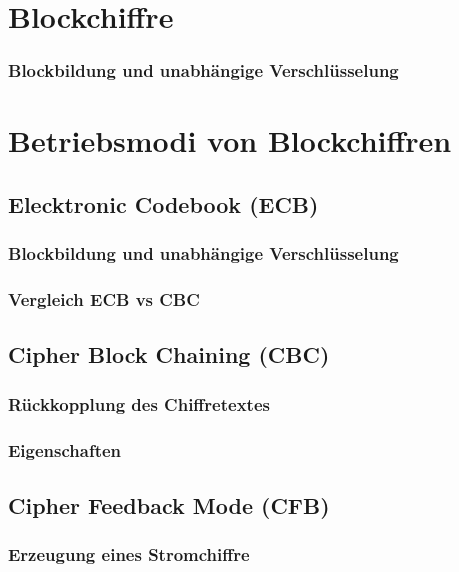 \section{Blockchiffre}
\subsubsection*{Blockbildung und unabhängige Verschlüsselung}

\section{Betriebsmodi von Blockchiffren}

\subsection{Elecktronic Codebook (ECB)}
\subsubsection*{Blockbildung und unabhängige Verschlüsselung}
\subsubsection*{Vergleich ECB vs CBC}

\subsection{Cipher Block Chaining (CBC)}
\subsubsection*{Rückkopplung des Chiffretextes}
\subsubsection*{Eigenschaften}

\subsection{Cipher Feedback Mode (CFB)}
\subsubsection*{Erzeugung eines Stromchiffre}
